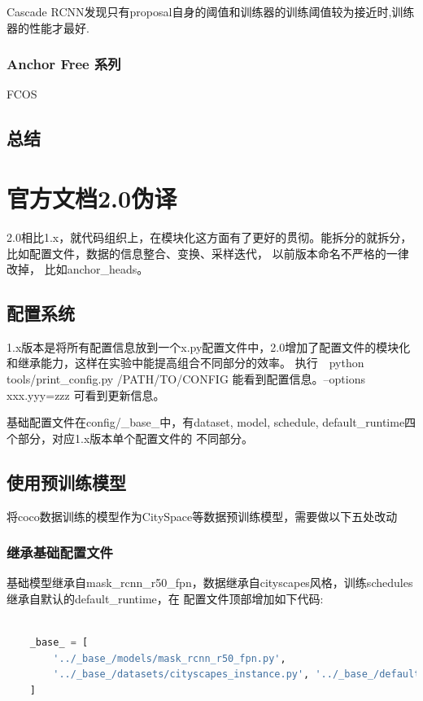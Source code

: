 \documentclass[UTF8]{ctexart}
\begin{document}
Cascade RCNN发现只有proposal自身的阈值和训练器的训练阈值较为接近时,训练器的性能才最好.
\subsubsection{Anchor Free 系列}
FCOS


\subsection{总结}


\section{官方文档2.0伪译}
2.0相比1.x，就代码组织上，在模块化这方面有了更好的贯彻。能拆分的就拆分，比如配置文件，数据的信息整合、变换、采样迭代，
以前版本命名不严格的一律改掉， 比如anchor\_heads。
\subsection{配置系统}
1.x版本是将所有配置信息放到一个x.py配置文件中，2.0增加了配置文件的模块化和继承能力，这样在实验中能提高组合不同部分的效率。
执行　python tools/print\_config.py /PATH/TO/CONFIG 能看到配置信息。--options xxx.yyy=zzz  可看到更新信息。

基础配置文件在config/\_base\_中，有dataset, model, schedule, default\_runtime四个部分，对应1.x版本单个配置文件的
不同部分。


\subsection{使用预训练模型}
将coco数据训练的模型作为CitySpace等数据预训练模型，需要做以下五处改动

\subsubsection{继承基础配置文件}
基础模型继承自mask\_rcnn\_r50\_fpn，数据继承自cityscapes风格，训练schedules继承自默认的default\_runtime，在
配置文件顶部增加如下代码:

\lstset{style=mystyle}
\begin{lstlisting}[language=Python]

	_base_ = [
		'../_base_/models/mask_rcnn_r50_fpn.py',
		'../_base_/datasets/cityscapes_instance.py', '../_base_/default_runtime.py'
	]
	
\end{lstlisting}
\end{document}
